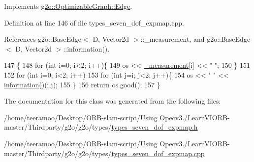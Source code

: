Implements \hyperlink{classg2o_1_1OptimizableGraph_1_1Edge_a804b9a2178249b9297c55b8fbbeda56e}{g2o\+::\+Optimizable\+Graph\+::\+Edge}.



Definition at line 146 of file types\+\_\+seven\+\_\+dof\+\_\+expmap.\+cpp.



References g2o\+::\+Base\+Edge$<$ D, Vector2d $>$\+::\+\_\+measurement, and g2o\+::\+Base\+Edge$<$ D, Vector2d $>$\+::information().


\begin{DoxyCode}
147   \{
148     \textcolor{keywordflow}{for} (\textcolor{keywordtype}{int} i=0; i<2; i++)\{
149       os  << \hyperlink{classg2o_1_1BaseEdge_af2a6ab1df6e91601b4cab23e0e99e034}{\_measurement}[i] << \textcolor{stringliteral}{" "};
150     \}
151 
152     \textcolor{keywordflow}{for} (\textcolor{keywordtype}{int} i=0; i<2; i++)
153       \textcolor{keywordflow}{for} (\textcolor{keywordtype}{int} j=i; j<2; j++)\{
154   os << \textcolor{stringliteral}{" "} <<  \hyperlink{classg2o_1_1BaseEdge_ab682086df7223ce2b039d652416ddc23}{information}()(i,j);
155     \}
156     \textcolor{keywordflow}{return} os.good();
157   \}
\end{DoxyCode}


The documentation for this class was generated from the following files\+:\begin{DoxyCompactItemize}
\item 
/home/teeramoo/\+Desktop/\+O\+R\+B-\/slam-\/script/\+Using Opecv3./\+Learn\+V\+I\+O\+R\+B-\/master/\+Thirdparty/g2o/g2o/types/\hyperlink{types__seven__dof__expmap_8h}{types\+\_\+seven\+\_\+dof\+\_\+expmap.\+h}\item 
/home/teeramoo/\+Desktop/\+O\+R\+B-\/slam-\/script/\+Using Opecv3./\+Learn\+V\+I\+O\+R\+B-\/master/\+Thirdparty/g2o/g2o/types/\hyperlink{types__seven__dof__expmap_8cpp}{types\+\_\+seven\+\_\+dof\+\_\+expmap.\+cpp}\end{DoxyCompactItemize}
